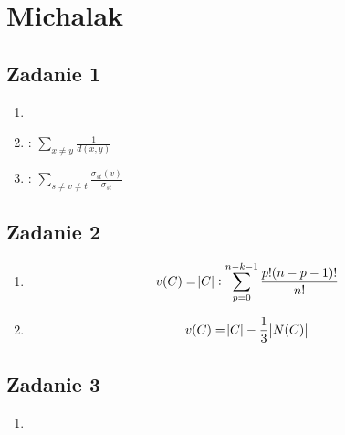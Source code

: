 \section{Michalak}

\subsection{Zadanie 1}
\begin{enumerate}
    \item
    \item
        :
        $\sum_{x\neq y}{\frac{1}{d(x,y)}}$
    \item
        :
        $\sum_{s\neq v \neq t} \frac{\sigma_{st}(v)}{\sigma_{st}}$

\end{enumerate}

\subsection{Zadanie 2}
\begin{enumerate}
    \item
        $$
        v(C) = \abs{C}:
        \sum^{n - k - 1}_{p = 0} \frac{p! (n - p - 1)!}{n!}
        $$
    \item
        $$
        v(C) = \abs{C} - \frac{1}{3} \abs{N(C)}
        $$


\end{enumerate}

\subsection{Zadanie 3}
\begin{enumerate}
    \item
\end{enumerate}

